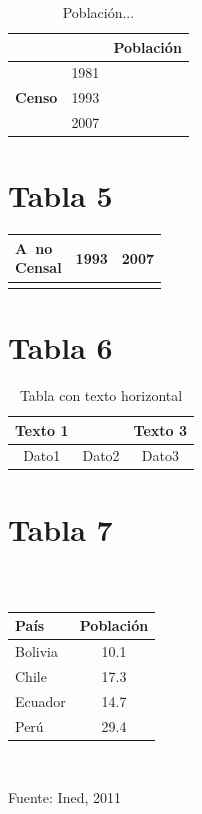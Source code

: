 \documentclass[12pt,a4paper]{article}
\begin{document}
\begin{table}[h]
	\centering
	\caption{Población...}
	\begin{tabular}{|l|l|l|}
		\hline                          &      & \bf Población \\
		\hline
		\multirow {3}{1.5cm}{\bf Censo} & 1981 &               \\
		                                & 1993 &               \\
		                                & 2007 &               \\
		\hline
	\end{tabular}
\end{table}

\section{Tabla 5}
\begin{tabular}{|l|c|c|}
	\hline
	\diagbox[width=10em]{Distrito} {A~no \\Censal}&1993 & 2007\\
	\hline &  &                          \\
	\hline
\end{tabular}

\section{Tabla 6}
\pagebreak

\begin{table}
	\caption{Tabla con texto horizontal}
	\begin{tabular}{|c|c|c|}
		\hline Texto 1 & \rotatebox{90}{Texto 2\,} & Texto 3 \\
		\hline Dato1   & Dato2                     & Dato3   \\
		\hline
	\end{tabular}
\end{table}

\section{Tabla 7}

\begin{table}[h]
	\centering
	\parbox{5cm}{\caption{ }} \\
	{
	\begin{tabular}{ l c}
		\hline País    & Población \\
		\hline Bolivia & 10.1      \\
		Chile          & 17.3      \\
		Ecuador        & 14.7      \\
		Perú           & 29.4      \\
		\hline
	\end{tabular}
	} \\[0.1cm]
	\parbox{5cm}{\hspace{0.5cm} {\footnotesize Fuente: Ined, 2011}}
\end{table}
\end{document}
